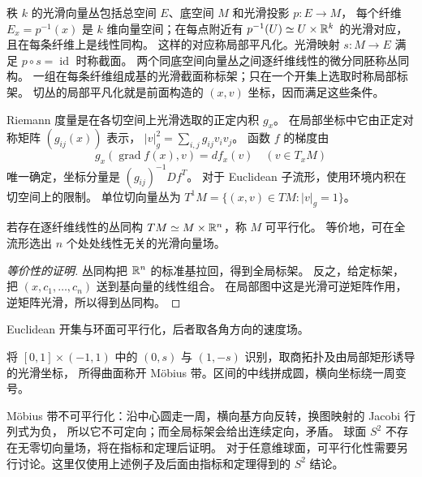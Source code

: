 \begin{definition}\label{def:vector-bundle}
秩 $k$ 的光滑向量丛包括总空间 $E$、底空间 $M$ 和光滑投影 $p:E\to M$，
每个纤维 $E_x=p^{-1}(x)$ 是 $k$ 维向量空间；在每点附近有
$p^{-1}(U)\simeq U\times\mathbb{R}^k$ 的光滑对应，且在每条纤维上是线性同构。
这样的对应称局部平凡化。光滑映射 $s:M\to E$ 满足 $p\circ s=\operatorname{id}$ 时称截面。
两个同底空间向量丛之间逐纤维线性的微分同胚称丛同构。
一组在每条纤维组成基的光滑截面称标架；只在一个开集上选取时称局部标架。
切丛的局部平凡化就是前面构造的 $(x,v)$ 坐标，因而满足这些条件。
\end{definition}
\begin{definition}[度量与梯度]\label{def:riemannian-gradient}
Riemann 度量是在各切空间上光滑选取的正定内积 $g_x$。
在局部坐标中它由正定对称矩阵 $(g_{ij}(x))$ 表示，
$|v|_g^2=\sum_{i,j}g_{ij}v_iv_j$。
函数 $f$ 的梯度由
\[
 g_x(\operatorname{grad}f(x),v)=df_x(v)\quad(v\in T_xM)
\]
唯一确定，坐标分量是 $(g_{ij})^{-1}Df^T$。
对于 Euclidean 子流形，使用环境内积在切空间上的限制。
单位切向量丛为 $T^1M=\{(x,v)\in TM:|v|_g=1\}$。
\end{definition}

\begin{definition}
若存在逐纤维线性的丛同构 $TM\simeq M\times\mathbb{R}^n$，称 $M$ 可平行化。
等价地，可在全流形选出 $n$ 个处处线性无关的光滑向量场。
\end{definition}
\begin{proof}[等价性的证明]
丛同构把 $\mathbb{R}^n$ 的标准基拉回，得到全局标架。
反之，给定标架，把 $(x,c_1,\ldots,c_n)$ 送到基向量的线性组合。
在局部图中这是光滑可逆矩阵作用，逆矩阵光滑，所以得到丛同构。
\end{proof}
Euclidean 开集与环面可平行化，后者取各角方向的速度场。

\begin{definition}[Möbius 带]
将 $[0,1]\times(-1,1)$ 中的 $(0,s)$ 与 $(1,-s)$ 识别，取商拓扑及由局部矩形诱导的光滑坐标，
所得曲面称开 Möbius 带。区间的中线拼成圆，横向坐标绕一周变号。
\end{definition}

Möbius 带不可平行化：沿中心圆走一周，横向基方向反转，换图映射的 Jacobi 行列式为负，
所以它不可定向；而全局标架会给出连续定向，矛盾。
球面 $S^2$ 不存在无零切向量场，将在指标和定理后证明。
对于任意维球面，可平行化性需要另行讨论。这里仅使用上述例子及后面由指标和定理得到的 $S^2$ 结论。

